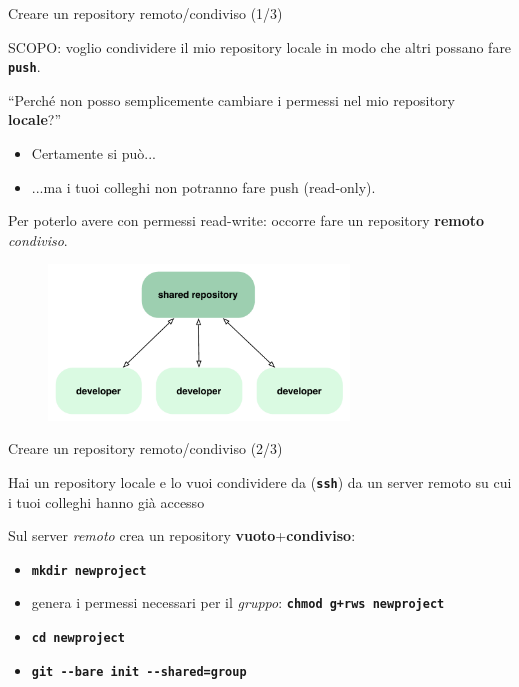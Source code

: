 \documentclass{beamer}
\begin{document}
\begin{frame}{\centerline{Creare un repository remoto/condiviso (1/3)}}
  \begin{center}
    SCOPO: voglio condividere il mio repository locale in modo che altri possano fare \texttt{\textbf{push}}.
  \end{center}
  ``Perch\'{e} non posso semplicemente cambiare i permessi nel mio repository \textbf{locale}?''
  \begin{itemize}
  \item Certamente si pu\`{o}...
  \item ...ma i tuoi colleghi non potranno fare push (\alert{read-only}).
  \end{itemize}
  \begin{center}
    Per poterlo avere con permessi \alert{read-write}: occorre fare un repository \textbf{remoto}
    \emph{condiviso}.
  \end{center}
  \begin{figure}
    \centering
    \includegraphics[width=8cm]{A2023.LavoroCondiviso/workflow-a}
  \end{figure}
\end{frame}

\begin{frame}{\centerline{Creare un repository remoto/condiviso (2/3)}}
  Hai un repository locale e lo vuoi condividere da 
  (\texttt{\textbf{ssh}}) da un server remoto su cui i tuoi colleghi hanno gi\`{a} accesso
  \begin{block}{Sul server \emph{remoto} crea un repository 
      \textbf{vuoto}+\textbf{condiviso}:}
    \begin{itemize}
    \item \texttt{\textbf{mkdir newproject}}
    \item genera i permessi necessari per il \emph{gruppo}: \texttt{\textbf{chmod g+rws newproject}}
    \item \texttt{\textbf{cd newproject}}
    \item \texttt{\textbf{git \alert{-{}-bare} init \alert{-{}-shared=group}}}
    \end{itemize}
  \end{block}

\end{frame}
\end{document}
